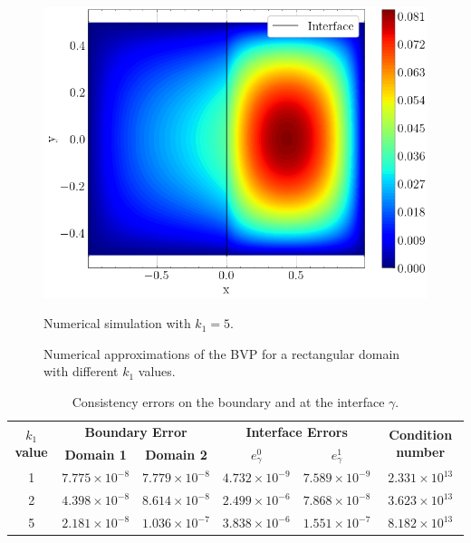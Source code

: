 \begin{figure}[!htb]
    \begin{minipage}{.6\textwidth}
      \centering
      \includegraphics[width=0.8\linewidth]{Images/Transmission/Rectangle_contour_600_150_k1_5.png}
      \caption{Numerical simulation with  \(k_1=5\).}
      \label{transmission_rectangle_plot_k1_5}
    \end{minipage}

    \caption*{Numerical approximations of the \ac{BVP} for a rectangular domain with different \(k_1\) values.}
    \label{transmission_rectangle_plots}
\end{figure}

\begin{table}[htbp]
    \centering
    \begin{tabular}{cccccc}
      \toprule
      \multirow{2}{*}{\textbf{\(k_1\) value}} & \multicolumn{2}{c}{\textbf{Boundary Error}} & \multicolumn{2}{c}{\textbf{Interface Errors}} & \multirow{2}{*}{\textbf{Condition number}} \\
      \cmidrule(lr){2-3} \cmidrule(lr){4-5}
      & \textbf{Domain 1} & \textbf{Domain 2} & \textbf{\(e_\gamma^0\)} & \textbf{\(e_\gamma^1\)} & \\
      \midrule
      1 & $7.775\times10^{-8}$ & $7.779\times10^{-8}$ & $4.732\times10^{-9}$ & $7.589\times10^{-9}$ & $2.331\times 10^{13}$\\
      2 & $4.398\times10^{-8}$ & $8.614\times10^{-8}$ & $2.499\times10^{-6}$ & $7.868\times10^{-8}$ & $3.623\times 10^{13}$\\
      5 & $2.181\times10^{-8}$ & $1.036\times10^{-7}$ & $3.838\times10^{-6}$ & $1.551\times10^{-7}$ & $8.182\times 10^{13}$\\
      \bottomrule
    \end{tabular}
    \caption{Consistency errors on the boundary and at the interface \(\gamma\).}
    \label{tab:transmission_results_rectangle}
\end{table}

